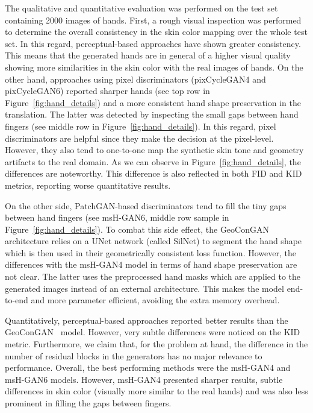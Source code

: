 The qualitative and quantitative evaluation was performed on the test set containing 2000 images of hands. First, a rough visual inspection was performed to determine the overall consistency in the skin color mapping over the whole test set. In this regard, perceptual-based approaches have shown greater consistency. This means that the generated hands are in general of a higher visual quality showing more similarities in the skin color with the real images of hands. On the other hand, approaches using pixel discriminators (pixCycleGAN4 and pixCycleGAN6) reported sharper hands (see top row in Figure~\ref{fig:hand_details}) and a more consistent hand shape preservation in the translation. The latter was detected by inspecting the small gaps between hand fingers (see middle row in Figure~\ref{fig:hand_details}). In this regard, pixel discriminators are helpful since they make the decision at the pixel-level. However, they also tend to one-to-one map the synthetic skin tone and geometry artifacts to the real domain. As we can observe in Figure~\ref{fig:hand_details}, the differences are noteworthy. This difference is also reflected in both \ac{FID} and \ac{KID} metrics, reporting worse quantitative results.

On the other side, PatchGAN-based discriminators tend to fill the tiny gaps between hand fingers (see msH-GAN6, middle row sample in Figure~\ref{fig:hand_details}). To combat this side effect, the \ac{GeoConGAN} architecture relies on a UNet network (called SilNet) to segment the hand shape which is then used in their geometrically consistent loss function. However, the differences with the msH-GAN4 model in terms of hand shape preservation are not clear. The latter uses the preprocessed hand masks which are applied to the generated images instead of an external architecture. This makes the model end-to-end and more parameter efficient, avoiding the extra memory overhead.

Quantitatively, perceptual-based approaches reported better results than the \ac{GeoConGAN}~\cite{Mueller2018} model. However, very subtle differences were noticed on the \ac{KID} metric. Furthermore, we claim that, for the problem at hand, the difference in the number of residual blocks in the generators has no major relevance to performance. Overall, the best performing methods were the msH-GAN4 and msH-GAN6 models. However, msH-GAN4 presented sharper results, subtle differences in skin color (visually more similar to the real hands) and was also less prominent in filling the gaps between fingers.

